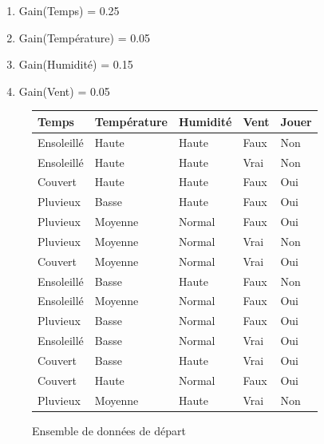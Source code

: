 \documentclass[a4paper, 11pt]{report}
\begin{document}
\begin{enumerate}
\item Gain(Temps) = 0.25 
\item Gain(Température) = 0.05 
\item Gain(Humidité) = 0.15
\item Gain(Vent) = 0.05
\end{enumerate}
\newpage
\begin{figure}[!h]
\begin{small}

\begin{center}

\caption{Ensemble de données de départ}
\begin{tabular}{| l | l | l | l | l |}
\hline
\rowcolor{gray!25}
Temps & Température & Humidité & Vent & Jouer \\
\hline
Ensoleillé & Haute & Haute & Faux & \cellcolor{green}Non \\
\hline
Ensoleillé & Haute & Haute & Vrai & \cellcolor{green}Non \\
\hline
Couvert & Haute & Haute & Faux & \cellcolor{yellow}Oui \\
\hline
Pluvieux & Basse & Haute & Faux & \cellcolor{yellow}Oui \\
\hline
Pluvieux & Moyenne & Normal & Faux & \cellcolor{yellow}Oui \\
\hline
Pluvieux & Moyenne & Normal & Vrai &  \cellcolor{green}Non \\
\hline
Couvert & Moyenne & Normal & Vrai &  \cellcolor{yellow}Oui \\
\hline
Ensoleillé & Basse & Haute & Faux &  \cellcolor{green}Non \\
\hline
Ensoleillé & Moyenne & Normal & Faux &  \cellcolor{yellow}Oui \\
\hline
Pluvieux & Basse & Normal & Faux &  \cellcolor{yellow}Oui \\
\hline
Ensoleillé & Basse & Normal & Vrai &  \cellcolor{yellow}Oui \\
\hline
Couvert & Basse & Haute & Vrai &  \cellcolor{yellow}Oui \\
\hline
Couvert & Haute & Normal & Faux &  \cellcolor{yellow}Oui \\
\hline
Pluvieux & Moyenne & Haute & Vrai &  \cellcolor{green}Non \\
\hline
\end{tabular}
\end{center}
\end{small}

\end{figure}
\end{document}
